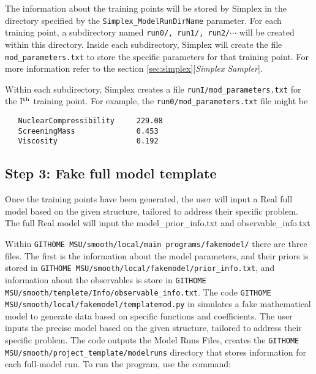 \documentclass[main.tex]{subfiles}
\begin{document}
The information about the training points will be stored by Simplex in the directory specified by the {\tt Simplex\_ModelRunDirName} parameter. For each training point, a subdirectory named {\tt run0/, run1/, run2/}$\cdots$ will be created within this directory. Inside each subdirectory, Simplex will create the file {\tt mod\_parameters.txt} to store the specific parameters for that training point. For more information refer to the section \ref{sec:simplex}[{\it Simplex Sampler}].

Within each subdirectory, Simplex creates a file {\tt runI/mod\_parameters.txt} for the I$^{\rm th}$ training point. For example, the {\tt run0/mod\_parameters.txt} file might be
{\tt\begin{verbatim}
   NuclearCompressibility     229.08
   ScreeningMass              0.453
   Viscosity                  0.192
\end{verbatim}
}


\subsection{Step 3: Fake full model template}
Once the training points have been generated, the user will input a Real full model based on the given structure, tailored to address their specific problem. The full Real model will input the model\_prior\_info.txt and observable\_info.txt

Within {\tt GITHOME MSU/smooth/local/main programs/fakemodel/} there are three files. The first is the information about the model parameters, and their priors is stored in {\tt GITHOME MSU/smooth/local/fakemodel/prior\_info.txt}, and information about the observables is store in {\tt GITHOME MSU/smooth/templete/Info/observable\_info.txt}. The code
{\tt GITHOME MSU/smooth/local/fakemodel/templatemod.py} in simulates a fake mathematical model to generate data based on specific functions and coefficients. The user inputs the precise model based on the given structure, tailored to address their specific problem. The code outputs the Model Runs Files, creates the {\tt GITHOME MSU/smooth/project\_template/modelruns} directory that stores information for each full-model run.
To run the program, use the command:
\end{document}
